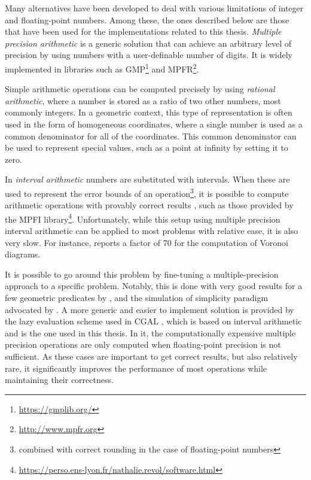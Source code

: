 Many alternatives have been developed to deal with various limitations of integer and floating-point numbers.
Among these, the ones described below are those that have been used for the implementations related to this thesis.
\emph{Multiple precision arithmetic} is a generic solution that can achieve an arbitrary level of precision by using numbers with a user-definable number of digits.
It is widely implemented in libraries such as GMP\footnote{\url{https://gmplib.org/}} and MPFR\footnote{\url{http://www.mpfr.org}}.

Simple arithmetic operations can be computed precisely by using \emph{rational arithmetic}, where a number is stored as a ratio of two other numbers, most commonly integers.
In a geometric context, this type of representation is often used in the form of homogeneous coordinates, where a single number is used as a common denominator for all of the coordinates.
This common denominator can be used to represent special values, such as a point at infinity by setting it to zero.

In \emph{interval arithmetic} numbers are substituted with intervals.
When these are used to represent the error bounds of an operation\footnote{combined with correct rounding in the case of floating-point numbers}, it is possible to compute arithmetic operations with provably correct results \citep[Ch.~2]{Ratschek88}, such as those provided by the MPFI library\footnote{\url{https://perso.ens-lyon.fr/nathalie.revol/software.html}}.
Unfortunately, while this setup using multiple precision interval arithmetic can be applied to most problems with relative ease, it is also very slow.
For instance, \citet{Held11} reports a factor of 70 for the computation of Voronoi diagrams.

It is possible to go around this problem by fine-tuning a multiple-precision approach to a specific problem.
Notably, this is done with very good results for a few geometric predicates by \citet{Shewchuk97}, and the simulation of simplicity paradigm advocated by \citet{Edelsbrunner90}.
A more generic and easier to implement solution is provided by the lazy evaluation scheme used in CGAL \citep{Pion11}, which is based on interval arithmetic and is the one used in this thesis.
In it, the computationally expensive multiple precision operations are only computed when floating-point precision is not sufficient.
As these cases are important to get correct results, but also relatively rare, it significantly improves the performance of most operations while maintaining their correctness.

